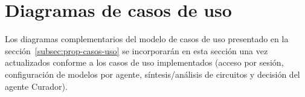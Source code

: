 \chapter{Diagramas de casos de uso}
\label{apend:casos-uso}

Los diagramas complementarios del modelo de casos de uso presentado en la sección~\ref{subsec:prop-casos-uso} se incorporarán en esta sección una vez actualizados conforme a los casos de uso implementados (acceso por sesión, configuración de modelos por agente, síntesis/análisis de circuitos y decisión del agente Curador).


